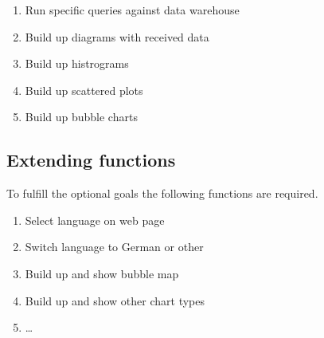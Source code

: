 \begin{enumerate}[resume]
  
  \item Run specific queries against data warehouse  
  
  \item Build up diagrams with received data  %
  
  \item Build up histrograms
  
  \item Build up scattered plots
  
  \item Build up bubble charts

\end{enumerate}


\subsection{Extending functions}

To fulfill the optional goals the following functions are required.

\begin{enumerate}[resume]
  
  \item Select language on web page
  
  \item Switch language to German or other
  
  \item Build up and show bubble map %
  
  \item Build up and show other chart types
  
  \item \ldots 
 
\end{enumerate}
